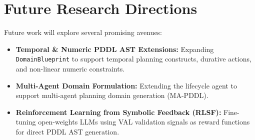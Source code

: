 \section{Future Research Directions}
Future work will explore several promising avenues:
\begin{itemize}
    \item \textbf{Temporal \& Numeric PDDL AST Extensions:} Expanding \texttt{DomainBlueprint} to support temporal planning constructs, durative actions, and non-linear numeric constraints.
    \item \textbf{Multi-Agent Domain Formulation:} Extending the lifecycle agent to support multi-agent planning domain generation (MA-PDDL).
    \item \textbf{Reinforcement Learning from Symbolic Feedback (RLSF):} Fine-tuning open-weights LLMs using VAL validation signals as reward functions for direct PDDL AST generation.
\end{itemize}
